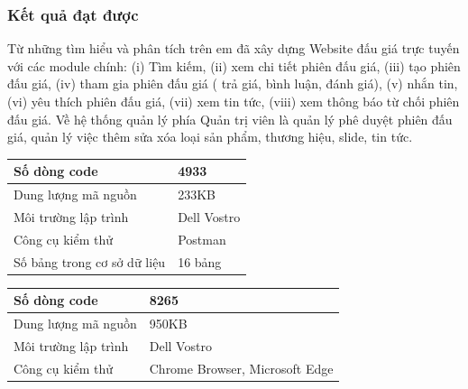 \documentclass{article}
\begin{document}
\subsubsection{Kết quả đạt được}
Từ những tìm hiểu và phân tích trên em đã xây dựng Website đấu giá trực tuyến với các module chính: (i) Tìm kiếm, (ii) xem chi tiết phiên đấu giá, (iii) tạo phiên đấu giá, (iv) tham gia phiên đấu giá ( trả giá, bình luận, đánh giá), (v) nhắn tin, (vi) yêu thích phiên đấu giá, (vii) xem tin tức, (viii) xem thông báo từ chối phiên đấu giá. Về hệ thống quản lý phía Quản trị viên là quản lý phê duyệt phiên đấu giá, quản lý việc thêm sửa xóa loại sản phẩm, thương hiệu, slide, tin tức.
    \tabletail{\hline}
    \label{bang410}
    \begin{supertabular}{| p{.45\textwidth}| p{.45\textwidth} |} 
    \hline
        Số dòng code& 4933\\\hline
        Dung lượng mã nguồn&233KB \\\hline
        Môi trường lập trình&Dell Vostro \\\hline
        Công cụ kiểm thử & Postman\\\hline
        Số bảng trong cơ sở dữ liệu  &16 bảng \\\hline
    \end{supertabular}
    \tabletail{\hline}
    \label{bang411}
    \begin{supertabular}{| p{.45\textwidth}| p{.45\textwidth} |} 
    \hline
        Số dòng code& 8265\\\hline
        Dung lượng mã nguồn&950KB \\\hline
        Môi trường lập trình&Dell Vostro \\\hline
        Công cụ kiểm thử & Chrome Browser, Microsoft Edge\\\hline
    \end{supertabular}
\end{document}
